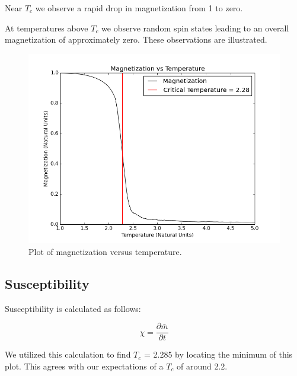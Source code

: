 \documentclass[10pt]{article}
\newcommand{\beq}{\begin{equation}}
\newcommand{\eeq}{\end{equation}}
\newcommand{\n}{\noindent}
\begin{document}
Near $T_c$ we observe a rapid drop in magnetization from 1 to zero.

At temperatures above $T_c$ we observe random spin states leading to an overall magnetization of approximately zero.  These observations are illustrated.

\begin{figure}[H]
\centering
\begin{minipage}{.75\textwidth}
\centering
\includegraphics[width= \linewidth]{Mag_v_Temp.png}
\end{minipage}\hfill
\caption{Plot of magnetization versus temperature.}
\label{fig:figure1}
\end{figure}
\n
\subsection{Susceptibility}
Susceptibility is calculated as follows:

\beq
\label{eqn:equation4}
\chi=\frac{\partial \bar{m}}{\partial t}
\eeq

We utilized this calculation to find $T_c$ = 2.285 by locating the minimum of this plot.  This agrees with our expectations of a $T_c$ of around 2.2.
\end{document}
